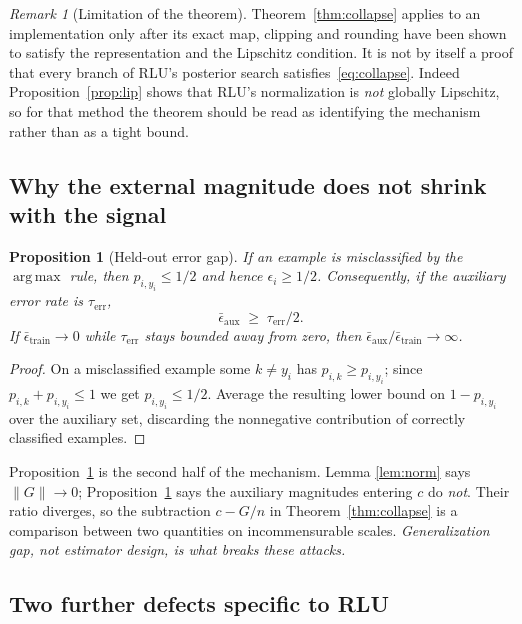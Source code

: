 \documentclass[11pt]{article}
\newtheorem{proposition}{Proposition}
\theoremstyle{remark}
\newtheorem{remark}{Remark}
\DeclareMathOperator*{\argmax}{arg\,max}
\begin{document}
\begin{remark}[Limitation of the theorem]
Theorem~\ref{thm:collapse} applies to an implementation only after its exact
map, clipping and rounding have been shown to satisfy the representation and
the Lipschitz condition. It is not by itself a proof that every branch of
RLU's posterior search satisfies~\eqref{eq:collapse}. Indeed
Proposition~\ref{prop:lip} shows that RLU's normalization is \emph{not}
globally Lipschitz, so for that method the theorem should be read as
identifying the mechanism rather than as a tight bound.
\end{remark}

\subsection{Why the external magnitude does not shrink with the signal}

\begin{proposition}[Held-out error gap]
\label{prop:gap}
If an example is misclassified by the $\argmax$ rule, then
$p_{i,y_i} \le 1/2$ and hence $\epsilon_i \ge 1/2$. Consequently, if the
auxiliary error rate is $\tau_{\mathrm{err}}$,
\[
 \bar\epsilon_{\mathrm{aux}} \;\ge\; \tau_{\mathrm{err}}/2 .
\]
If $\bar\epsilon_{\mathrm{train}} \to 0$ while $\tau_{\mathrm{err}}$ stays
bounded away from zero, then
$\bar\epsilon_{\mathrm{aux}}/\bar\epsilon_{\mathrm{train}} \to \infty$.
\end{proposition}

\begin{proof}
On a misclassified example some $k \ne y_i$ has $p_{i,k} \ge p_{i,y_i}$;
since $p_{i,k} + p_{i,y_i} \le 1$ we get $p_{i,y_i} \le 1/2$. Average the
resulting lower bound on $1 - p_{i,y_i}$ over the auxiliary set, discarding
the nonnegative contribution of correctly classified examples.
\end{proof}

Proposition~\ref{prop:gap} is the second half of the mechanism. Lemma
\ref{lem:norm} says $\|G\| \to 0$; Proposition~\ref{prop:gap} says the
auxiliary magnitudes entering $c$ do \emph{not}. Their ratio diverges, so the
subtraction $c - G/n$ in Theorem~\ref{thm:collapse} is a comparison between
two quantities on incommensurable scales. \emph{Generalization gap, not
estimator design, is what breaks these attacks.}

\subsection{Two further defects specific to RLU}
\end{document}
